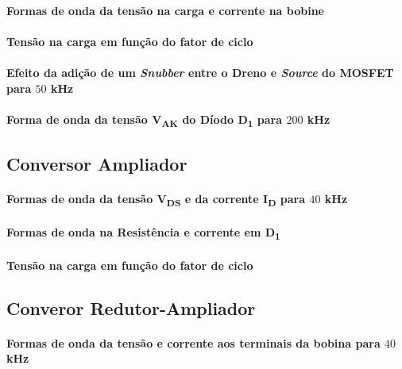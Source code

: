 \documentclass[a4paper,11pt]{article}
\numberwithin{equation}{section}
\begin{document}
\paragraph{Formas de onda da tensão na carga e corrente na bobine}

\paragraph{Tensão na carga em função do fator de ciclo}

\paragraph{Efeito da adição de um \textit{Snubber} entre o Dreno e \textit{Source} do MOSFET para $50$ kHz}

\paragraph{Forma de onda da tensão V\textsubscript{AK} do Díodo D\textsubscript{1} para $200$ kHz}

\subsection{Conversor Ampliador}

\paragraph{Formas de onda da tensão V\textsubscript{DS} e da corrente I\textsubscript{D} para $40$ kHz}

\paragraph{Formas de onda na Resistência e corrente em D\textsubscript{1}}

\paragraph{Tensão na carga em função do fator de ciclo}

\subsection{Converor Redutor-Ampliador}

\paragraph{Formas de onda da tensão e corrente aos terminais da bobina para $40$ kHz}
\end{document}
